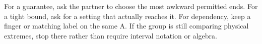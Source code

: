 For a guarantee, ask the partner to choose the most awkward permitted ends. For a tight bound, ask for a setting that actually reaches it. For dependency, keep a finger or matching label on the same A. If the group is still comparing physical extremes, stop there rather than require interval notation or algebra.
